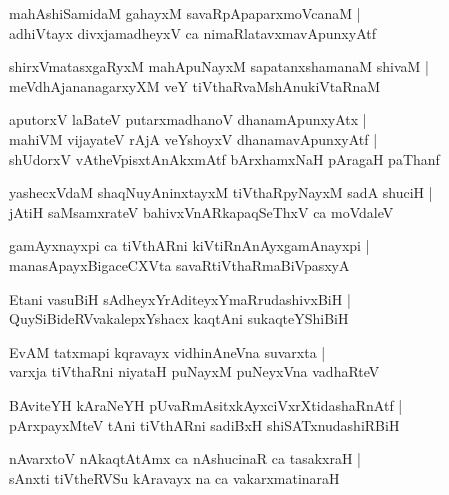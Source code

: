 \documentclass[twoside,12pt,openright]{book}
\newcounter{shloka}[chapter]
\begin{document}
\begin{shloka}
mahAshiSamidaM gahayxM savaRpApaparxmoVcanaM |\\
adhiVtayx divxjamadheyxV ca nimaRlatavxmavApunxyAtf 
\end{shloka}

\begin{shloka}
shirxVmatasxgaRyxM mahApuNayxM sapatanxshamanaM shivaM |\\
meVdhAjananagarxyXM veY tiVthaRvaMshAnukiVtaRnaM 
\end{shloka}

\begin{shloka}
aputorxV laBateV putarxmadhanoV dhanamApunxyAtx |\\
mahiVM vijayateV rAjA veYshoyxV dhanamavApunxyAtf |\\
shUdorxV vAtheVpisxtAnAkxmAtf bArxhamxNaH pAragaH paThanf 
\end{shloka}

\begin{shloka}
yashecxVdaM shaqNuyAninxtayxM tiVthaRpyNayxM sadA shuciH |\\
jAtiH saMsamxrateV bahivxVnARkapaqSeThxV ca moVdaleV 
\end{shloka}

\begin{shloka}
gamAyxnayxpi ca tiVthARni kiVtiRnAnAyxgamAnayxpi |\\
manasApayxBigaceCXVta savaRtiVthaRmaBiVpasxyA 
\end{shloka}

\begin{shloka}
Etani vasuBiH sAdheyxYrAditeyxYmaRrudashivxBiH |\\
QuySiBideRVvakalepxYshacx kaqtAni sukaqteYShiBiH 
\end{shloka}

\begin{shloka}
EvAM tatxmapi kqravayx vidhinAneVna suvarxta |\\
varxja tiVthaRni niyataH puNayxM puNeyxVna vadhaRteV 
\end{shloka}

\begin{shloka}
BAviteYH kAraNeYH pUvaRmAsitxkAyxciVxrXtidashaRnAtf |\\
pArxpayxMteV tAni tiVthARni sadiBxH shiSATxnudashiRBiH
\end{shloka}

\begin{shloka}
nAvarxtoV nAkaqtAtAmx ca nAshucinaR ca tasakxraH |\\
sAnxti tiVtheRVSu kAravayx na ca vakarxmatinaraH 
\end{shloka}
\end{document}

